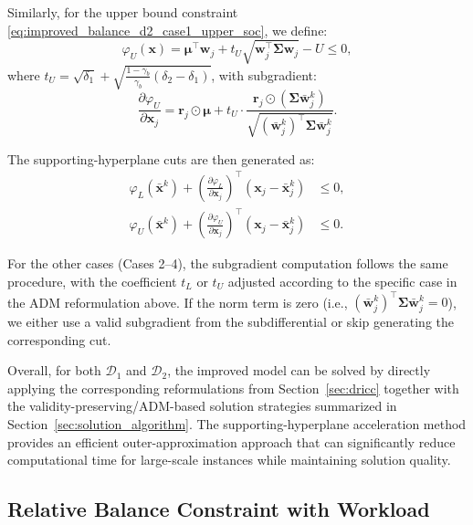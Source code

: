 \documentclass[preprint,12pt,authoryear]{elsarticle}
\begin{document}
Similarly, for the upper bound constraint \eqref{eq:improved_balance_d2_case1_upper_soc}, we define:
\begin{equation}
\varphi_U(\mathbf{x}) = \boldsymbol{\mu}^\top \mathbf{w}_j + t_U \sqrt{\mathbf{w}_j^\top \boldsymbol{\Sigma} \mathbf{w}_j} - U \leqslant 0,
\end{equation}
where $t_U = \sqrt{\delta_1} + \sqrt{\frac{1 - \gamma_b}{\gamma_b} (\delta_2 - \delta_1)}$, with subgradient:
\begin{equation}
\frac{\partial \varphi_U}{\partial \mathbf{x}_j} = \mathbf{r}_j \odot \boldsymbol{\mu} + t_U \cdot \frac{\mathbf{r}_j \odot (\boldsymbol{\Sigma} \bar{\mathbf{w}}_j^k)}{\sqrt{(\bar{\mathbf{w}}_j^k)^\top \boldsymbol{\Sigma} \bar{\mathbf{w}}_j^k}}.
\label{eq:improved_d2_subgradient_U}
\end{equation}

The supporting-hyperplane cuts are then generated as:
\begin{align}
\varphi_L(\bar{\mathbf{x}}^k) + \left(\frac{\partial \varphi_L}{\partial \mathbf{x}_j}\right)^\top (\mathbf{x}_j - \bar{\mathbf{x}}_j^k) &\leqslant 0, \label{eq:improved_d2_supporting_cut_lower} \\
\varphi_U(\bar{\mathbf{x}}^k) + \left(\frac{\partial \varphi_U}{\partial \mathbf{x}_j}\right)^\top (\mathbf{x}_j - \bar{\mathbf{x}}_j^k) &\leqslant 0. \label{eq:improved_d2_supporting_cut_upper}
\end{align}

For the other cases (Cases 2--4), the subgradient computation follows the same procedure, with the coefficient $t_L$ or $t_U$ adjusted according to the specific case in the ADM reformulation above. If the norm term is zero (i.e., $(\bar{\mathbf{w}}_j^k)^\top \boldsymbol{\Sigma} \bar{\mathbf{w}}_j^k = 0$), we either use a valid subgradient from the subdifferential or skip generating the corresponding cut.

Overall, for both $\mathcal{D}_1$ and $\mathcal{D}_2$, the improved model can be solved by directly applying the corresponding reformulations from Section~\ref{sec:dricc} together with the validity-preserving/ADM-based solution strategies summarized in Section~\ref{sec:solution_algorithm}. The supporting-hyperplane acceleration method provides an efficient outer-approximation approach that can significantly reduce computational time for large-scale instances while maintaining solution quality.

\subsection{Relative Balance Constraint with Workload}
\end{document}
